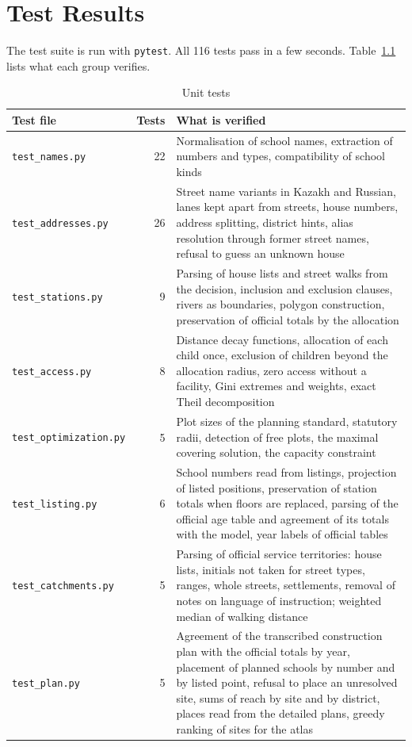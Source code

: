 \chapter{Test Results}
\label{app:tests}

The test suite is run with \texttt{pytest}. All 116 tests pass in a few seconds. Table~\ref{tab:tests} lists what each group verifies.

\begin{table}[ht]
\centering
\caption{Unit tests}
\label{tab:tests}
\small
\begin{tabularx}{\textwidth}{>{\raggedright\arraybackslash}p{4.4cm}r>{\raggedright\arraybackslash}X}
\toprule
Test file & Tests & What is verified \\
\midrule
\texttt{test\_names.py} & 22 & Normalisation of school names, extraction of numbers and types, compatibility of school kinds \\
\texttt{test\_addresses.py} & 26 & Street name variants in Kazakh and Russian, lanes kept apart from streets, house numbers, address splitting, district hints, alias resolution through former street names, refusal to guess an unknown house \\
\texttt{test\_stations.py} & 9 & Parsing of house lists and street walks from the decision, inclusion and exclusion clauses, rivers as boundaries, polygon construction, preservation of official totals by the allocation \\
\texttt{test\_access.py} & 8 & Distance decay functions, allocation of each child once, exclusion of children beyond the allocation radius, zero access without a facility, Gini extremes and weights, exact Theil decomposition \\
\texttt{test\_optimization.py} & 5 & Plot sizes of the planning standard, statutory radii, detection of free plots, the maximal covering solution, the capacity constraint \\
\texttt{test\_listing.py} & 6 & School numbers read from listings, projection of listed positions, preservation of station totals when floors are replaced, parsing of the official age table and agreement of its totals with the model, year labels of official tables \\
\texttt{test\_catchments.py} & 5 & Parsing of official service territories: house lists, initials not taken for street types, ranges, whole streets, settlements, removal of notes on language of instruction; weighted median of walking distance \\
\texttt{test\_plan.py} & 5 & Agreement of the transcribed construction plan with the official totals by year, placement of planned schools by number and by listed point, refusal to place an unresolved site, sums of reach by site and by district, places read from the detailed plans, greedy ranking of sites for the atlas \\

\end{tabularx}
\end{table}
